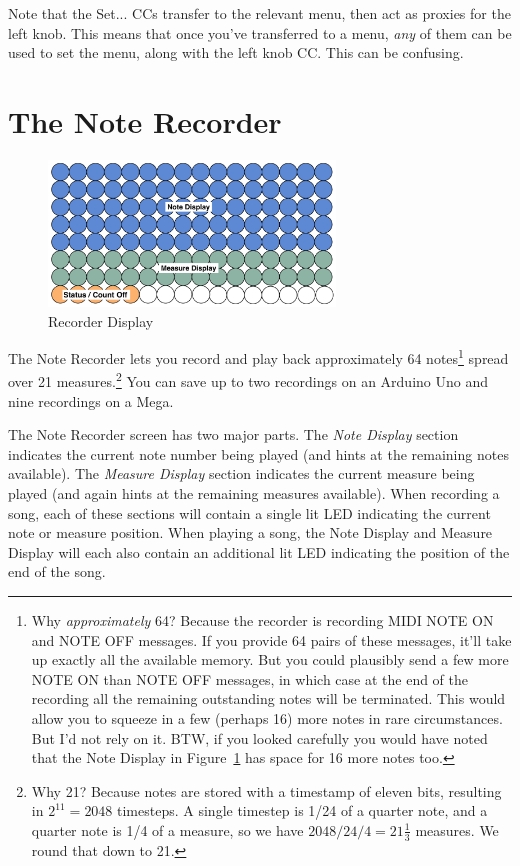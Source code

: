 \documentclass{article}
\begin{document}
\vspace{1em}
\noindent Note that the Set... CCs transfer to the relevant menu, then act as proxies for the left knob.  This means that once you've transferred to a menu, {\it any} of them can be used to set the menu, along with the left knob CC.  This can be confusing.


\clearpage

\section {The Note Recorder}

\begin{figure}
\vspace{-1.5em}\includegraphics[width=3in]{recorder.pdf}
\vspace{-2em}\caption{\small Recorder Display}\vspace{-1em}
\label{recorder}
\end{figure}

The Note Recorder lets you record and play back approximately 64 notes\footnote{Why {\it approximately} 64? Because the recorder is recording MIDI NOTE ON and NOTE OFF messages.  If you provide 64 pairs of these messages, it'll take up exactly all the available memory.  But you could plausibly send a few more NOTE ON than NOTE OFF messages, in which case at the end of the recording all the remaining outstanding notes will be terminated.  This would allow you to squeeze in a few (perhaps 16) more notes in rare circumstances.  But I'd not rely on it.  BTW, if you looked carefully you would have noted that the Note Display in Figure~\ref{recorder} has space for 16 more notes too.} spread over 21 measures.\footnote{Why 21?  Because notes are stored with a timestamp of eleven bits, resulting in \(2^{11} = 2048\) timesteps.  A single timestep is 1/24 of a quarter note, and a quarter note is 1/4 of a measure, so we have \(2048 / 24 / 4 = 21 \frac{1}{3}\) measures.  We round that down to 21.}  You can save up to two recordings on an Arduino Uno and nine recordings on a Mega.

The Note Recorder screen has two major parts.  The {\it Note Display} section indicates the current note number being played (and hints at the remaining notes available).  The {\it Measure Display} section indicates the current measure being played (and again hints at the remaining measures available).  When recording a song, each of these sections will contain a single lit LED indicating the current note or measure position.  When playing a song, the Note Display and Measure Display will each also contain an additional lit LED indicating the position of the end of the song.
\end{document}
